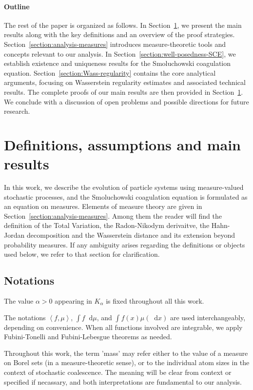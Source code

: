 \documentclass[11pt,a4paper]{article}
\newcommand{\brac}[1]{\left\langle#1\right\rangle}
\newcommand{\dd}{\mathop{}\!\mathrm{d}}
\begin{document}
\paragraph{Outline}

The rest of the paper is organized as follows. In Section~\ref{section-main-results}, we present the main results along with the key definitions and an overview of the proof strategies. Section~\ref{section:analysis-measures} introduces measure-theoretic tools and concepts relevant to our analysis. In Section~\ref{section:well-posedness-SCE}, we establish existence and uniqueness results for the Smoluchowski coagulation equation. Section~\ref{section:Wass-regularity} contains the core analytical arguments, focusing on Wasserstein regularity estimates and associated technical results. The complete proofs of our main results are then provided in Section~\ref{section-main-results}. We conclude with a discussion of open problems and possible directions for future research.



\section{Definitions, assumptions and main results}\label{section-main-results}
In this work, we describe the evolution of particle systems using measure-valued stochastic processes, and the Smoluchowski coagulation equation is formulated as an equation on measures. Elements of measure theory are given in Section~\ref{section:analysis-measures}. Among them the reader will find the definition of the Total Variation, the Radon-Nikodym derivaitve, the Hahn-Jordan decomposition and the Wasserstein distance and its extension beyond probability measures. If any ambiguity arises regarding the definitions or objects used below, we refer to that section for clarification.


\subsection{Notations}
The value $\alpha > 0$ appearing in $K_\alpha$ is fixed throughout all this work. 

The notations $\brac{f,\mu}$, $\int f \dd \mu$, and $\int f(x)\mu(\dd x)$ are used interchangeably, depending on convenience. When all functions involved are integrable, we apply Fubini-Tonelli and Fubini-Lebesgue theorems as needed.

Throughout this work, the term 'mass' may refer either to the value of a measure on Borel sets (in a measure-theoretic sense), or to the individual atom sizes in the context of stochastic coalescence. The meaning will be clear from context or specified if necassary, and both interpretations are fundamental to our analysis.
\end{document}
